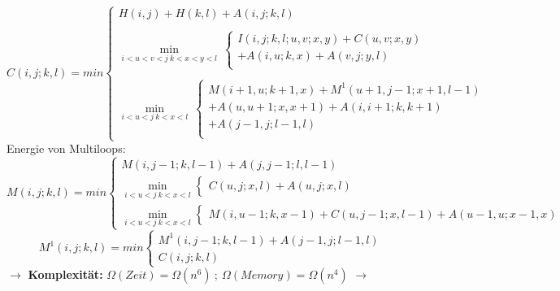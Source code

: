 \begin{equation}
	C(i,j; k,l) = min 
	\begin{cases} 
		H(i,j) + H(k,l) + A(i,j;k,l) \\ 
		\\					
		\displaystyle\min_{i < u < v < j \ k<x<y<l}\ 
		\begin{cases}
			I(i,j;k,l;u,v;x,y) + C(u,v;x,y)  \\
			+ A(i,u;k,x) + A(v,j;y,l)\\ 
		\end{cases}
		\\
		\\
		\displaystyle\min_{i<u<j \ k<x<l}\ 
		\begin{cases}
			M(i+1,u; k+1,x) + M^{1}(u+1,j-1;x+1,l-1) \\ 
			+ A(u,u+1; x,x+1) + A(i,i+1; k,k+1) \\ 
			+ A(j-1,j;l-1,l)\\ 
		\end{cases}
	\end{cases}
\end{equation}
Energie von Multiloops:
\begin{equation}
M(i,j;k,l) = min
\begin{cases}
M(i,j-1; k,l-1) + A(j,j-1; l,l-1) \\
\displaystyle\min_{i<u<j \ k<x<l} \begin{cases} C(u,j; x,l) + A(u,j;x,l) \end{cases}\\
\displaystyle\min_{i<u<j \ k<x<l} \begin{cases} M(i,u-1; k,x-1) + C(u,j-1; x,l-1) + A(u-1,u; x-1,x) \end{cases}
\end{cases}
\end{equation}
\begin{equation}
M^1(i,j;k,l) = min
\begin{cases}
M^1(i,j-1; k,l-1) + A(j-1,j; l-1,l)\\
C(i,j;k,l)
\end{cases}
\end{equation}
$\rightarrow$ \textbf{Komplexität:} $\Omega(Zeit) = \Omega(n^6) \ ; \ \Omega(Memory) = \Omega(n^4)$ $\rightarrow$

